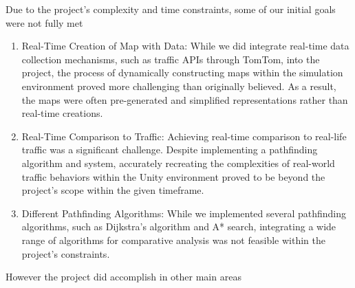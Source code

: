 Due to the project's complexity and time constraints, some of our initial goals were not fully met
\begin{enumerate}
	\item Real-Time Creation of Map with Data: While we did integrate real-time data collection mechanisms, such as traffic APIs through TomTom, into the project, the process of dynamically constructing maps within the simulation environment proved more challenging than originally believed. As a result, the maps were often pre-generated and simplified representations rather than real-time creations.
	\item Real-Time Comparison to Traffic: Achieving real-time comparison to real-life traffic was a significant challenge. Despite implementing a pathfinding algorithm and system, accurately recreating the complexities of real-world traffic behaviors within the Unity environment proved to be beyond the project's scope within the given timeframe.
	\item Different Pathfinding Algorithms: While we implemented several pathfinding algorithms, such as Dijkstra's algorithm and A* search, integrating a wide range of algorithms for comparative analysis was not feasible within the project's constraints.
\end{enumerate}
However the project did accomplish in other main areas
